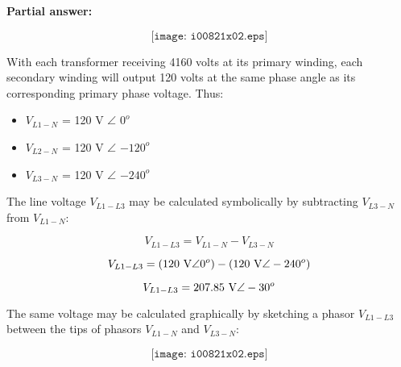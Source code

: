 \noindent
{\bf Partial answer:}

$$\texttt{[image: i00821x02.eps]}$$







With each transformer receiving 4160 volts at its primary winding, each secondary winding will output 120 volts at the same phase angle as its corresponding primary phase voltage.  Thus:

\begin{itemize}
\item{} $V_{L1-N}$ = 120 V $\angle$ $0^o$
\vskip 5pt
\item{} $V_{L2-N}$ = 120 V $\angle$ $-120^o$
\vskip 5pt
\item{} $V_{L3-N}$ = 120 V $\angle$ $-240^o$
\end{itemize}

The line voltage $V_{L1-L3}$ may be calculated symbolically by subtracting $V_{L3-N}$ from $V_{L1-N}$:

$$V_{L1-L3} = V_{L1-N} - V_{L3-N}$$

$$V_{L1-L3} = (120 \hbox{ V} \angle 0^o) - (120 \hbox{ V} \angle -240^o)$$

$$V_{L1-L3} = 207.85 \hbox{ V} \angle -30^o$$

The same voltage may be calculated graphically by sketching a phasor $V_{L1-L3}$ between the tips of phasors $V_{L1-N}$ and $V_{L3-N}$:

$$\texttt{[image: i00821x02.eps]}$$





